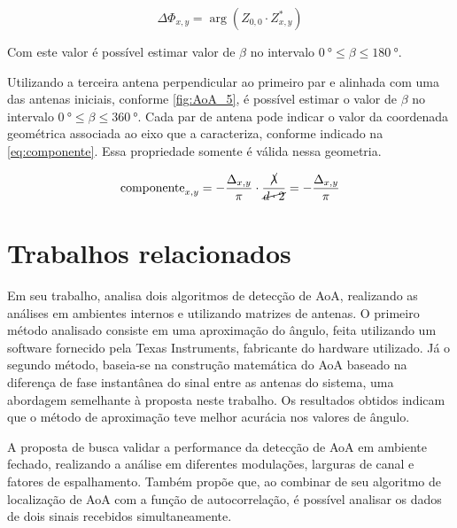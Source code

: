 \begin{equation}\label{eq:phase}
    \Delta\Phi_{x,y} = \arg(Z_{0,0}\cdot Z^*_{x,y})
\end{equation}

Com este valor é possível estimar valor de $\beta$ no intervalo $\SI{0}{\degree} \leq \beta \leq \SI{180}{\degree}$.

Utilizando a terceira antena perpendicular ao primeiro par e alinhada com uma das antenas iniciais, conforme \autoref{fig:AoA_5}, é possível estimar o valor de $\beta$ no intervalo $\SI{0}{\degree} \leq \beta \leq \SI{360}{\degree}$.
Cada par de antena pode indicar o valor da coordenada geométrica associada ao eixo que a caracteriza, conforme indicado na \autoref{eq:componente}.
Essa propriedade somente é válida nessa geometria.

\begin{equation}\label{eq:componente}
    \text{componente}_{x,y} = -\frac{\Delta_{x,y}}{\pi}\cdot\frac{\cancel{\lambda}}{\cancel{d \cdot 2}} = -\frac{\Delta_{x,y}}{\pi}
\end{equation}



\section{Trabalhos relacionados}

Em seu trabalho, \citeauthor{horst2021localization} \cite{horst2021localization} analisa dois algoritmos de detecção de \ac{AoA}, realizando as análises em ambientes internos e utilizando matrizes de antenas.
O primeiro método analisado consiste em uma aproximação do ângulo, feita utilizando um software fornecido pela Texas Instruments, fabricante do hardware utilizado.
Já o segundo método, baseia-se na construção matemática do \ac{AoA} baseado na diferença de fase instantânea do sinal entre as antenas do sistema, uma abordagem semelhante à proposta neste trabalho.
Os resultados obtidos indicam que o método de aproximação teve melhor acurácia nos valores de ângulo.

A proposta de \citeauthor{zeaiter:hal-03693641} \cite{zeaiter:hal-03693641} busca validar a performance da detecção de \ac{AoA} em ambiente fechado, realizando a análise em diferentes modulações, larguras de canal e fatores de espalhamento.
Também propõe que, ao combinar de seu algoritmo de localização de \ac{AoA} com a função de autocorrelação, é possível analisar os dados de dois sinais recebidos simultaneamente.

